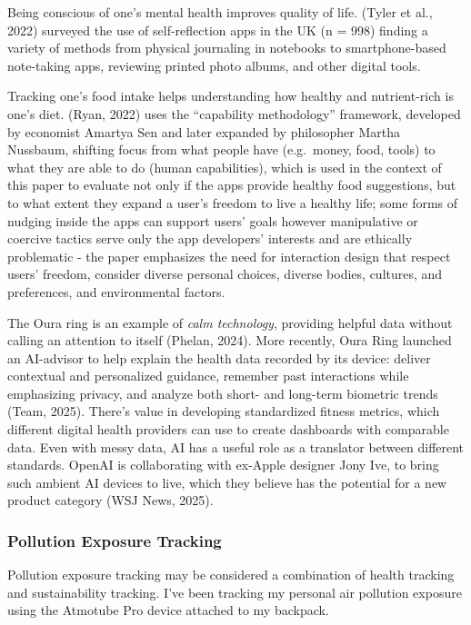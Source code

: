 \documentclass[
  12pt,
  letterpaper,
  DIV=11,
  numbers=noendperiod]{scrartcl}
\begin{document}
Being conscious of one's mental health improves quality of life. (Tyler
et al., 2022) surveyed the use of self-reflection apps in the UK (n =
998) finding a variety of methods from physical journaling in notebooks
to smartphone-based note-taking apps, reviewing printed photo albums,
and other digital tools.

Tracking one's food intake helps understanding how healthy and
nutrient-rich is one's diet. (Ryan, 2022) uses the ``capability
methodology'' framework, developed by economist Amartya Sen and later
expanded by philosopher Martha Nussbaum, shifting focus from what people
have (e.g.~money, food, tools) to what they are able to do (human
capabilities), which is used in the context of this paper to evaluate
not only if the apps provide healthy food suggestions, but to what
extent they expand a user's freedom to live a healthy life; some forms
of nudging inside the apps can support users' goals however manipulative
or coercive tactics serve only the app developers' interests and are
ethically problematic - the paper emphasizes the need for interaction
design that respect users' freedom, consider diverse personal choices,
diverse bodies, cultures, and preferences, and environmental factors.

The Oura ring is an example of \emph{calm technology}, providing helpful
data without calling an attention to itself (Phelan, 2024). More
recently, Oura Ring launched an AI-advisor to help explain the health
data recorded by its device: deliver contextual and personalized
guidance, remember past interactions while emphasizing privacy, and
analyze both short- and long-term biometric trends (Team, 2025). There's
value in developing standardized fitness metrics, which different
digital health providers can use to create dashboards with comparable
data. Even with messy data, AI has a useful role as a translator between
different standards. OpenAI is collaborating with ex-Apple designer Jony
Ive, to bring such ambient AI devices to live, which they believe has
the potential for a new product category (WSJ News, 2025).

\subsubsection{Pollution Exposure
Tracking}\label{pollution-exposure-tracking}

Pollution exposure tracking may be considered a combination of health
tracking and sustainability tracking. I've been tracking my personal air
pollution exposure using the Atmotube Pro device attached to my
backpack.
\end{document}

